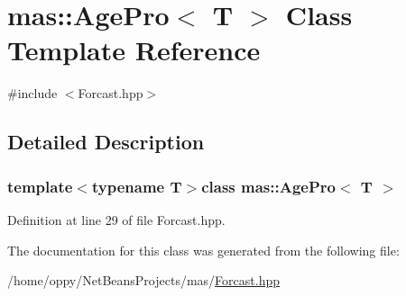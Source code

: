 \hypertarget{classmas_1_1_age_pro}{\section{mas\-:\-:Age\-Pro$<$ T $>$ Class Template Reference}
\label{classmas_1_1_age_pro}
}


{\ttfamily \#include $<$Forcast.\-hpp$>$}



\subsection{Detailed Description}
\subsubsection*{template$<$typename T$>$class mas\-::\-Age\-Pro$<$ T $>$}



Definition at line 29 of file Forcast.\-hpp.



The documentation for this class was generated from the following file\-:\begin{DoxyCompactItemize}
\item 
/home/oppy/\-Net\-Beans\-Projects/mas/\hyperlink{_forcast_8hpp}{Forcast.\-hpp}\end{DoxyCompactItemize}
